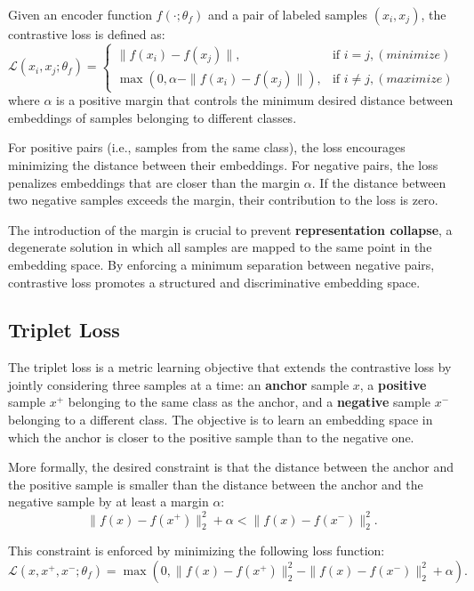 Given an encoder function $f(\cdot;\theta_f)$ and a pair of labeled samples $(x_i, x_j)$, the contrastive loss is defined as:
\[
\mathcal{L}(x_i, x_j; \theta_f) =
\begin{cases}
\| f(x_i) - f(x_j) \|, & \text{if } i = j ,(minimize) \\
\max\left(0, \alpha - \| f(x_i) - f(x_j) \| \right), & \text{if } i \neq j ,(maximize)
\end{cases}
\]
where $\alpha$ is a positive margin that controls the minimum desired distance between embeddings of samples belonging to different classes.

For positive pairs (i.e., samples from the same class), the loss encourages minimizing the distance between their embeddings. For negative pairs, the loss penalizes embeddings that are closer than the margin $\alpha$. If the distance between two negative samples exceeds the margin, their contribution to the loss is zero.

The introduction of the margin is crucial to prevent \textbf{representation collapse}, a degenerate solution in which all samples are mapped to the same point in the embedding space. By enforcing a minimum separation between negative pairs, contrastive loss promotes a structured and discriminative embedding space.

\subsection{Triplet Loss}

The triplet loss is a metric learning objective that extends the contrastive loss by jointly considering three samples at a time: an \textbf{anchor} sample $x$, a \textbf{positive} sample $x^+$ belonging to the same class as the anchor, and a \textbf{negative} sample $x^-$ belonging to a different class. The objective is to learn an embedding space in which the anchor is closer to the positive sample than to the negative one.

More formally, the desired constraint is that the distance between the anchor and the positive sample is smaller than the distance between the anchor and the negative sample by at least a margin $\alpha$:
\[
\| f(x) - f(x^+) \|_2^2 + \alpha < \| f(x) - f(x^-) \|_2^2.
\]

This constraint is enforced by minimizing the following loss function:
\[
\mathcal{L}(x, x^+, x^-; \theta_f) =
\max\left(0,
\| f(x) - f(x^+) \|_2^2
-
\| f(x) - f(x^-) \|_2^2
+ \alpha
\right).
\]

